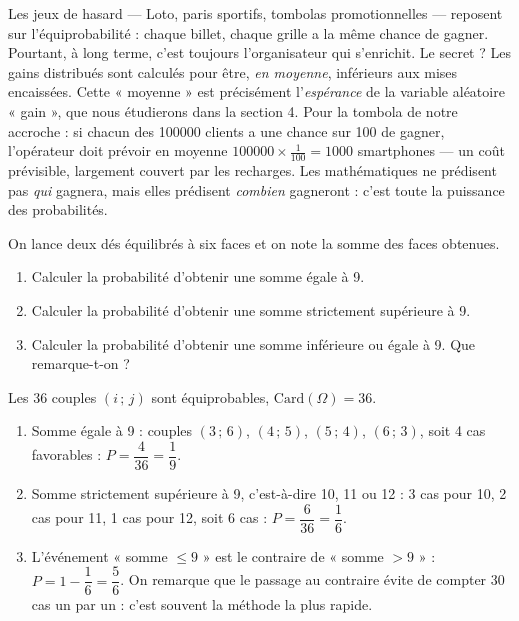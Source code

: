\documentclass[11pt]{article}
\begin{document}
\begin{savaistu}
Les jeux de hasard — Loto, paris sportifs, tombolas promotionnelles — reposent sur l'équiprobabilité : chaque billet, chaque grille a la même chance de gagner. Pourtant, à long terme, c'est toujours l'organisateur qui s'enrichit. Le secret ? Les gains distribués sont calculés pour être, \emph{en moyenne}, inférieurs aux mises encaissées. Cette « moyenne » est précisément l'\emph{espérance} de la variable aléatoire « gain », que nous étudierons dans la section 4. Pour la tombola de notre accroche : si chacun des \num{100000} clients a une chance sur 100 de gagner, l'opérateur doit prévoir en moyenne $\num{100000} \times \frac{1}{100} = \num{1000}$ smartphones — un coût prévisible, largement couvert par les recharges. Les mathématiques ne prédisent pas \emph{qui} gagnera, mais elles prédisent \emph{combien} gagneront : c'est toute la puissance des probabilités.
\end{savaistu}

\begin{exercice}
On lance deux dés équilibrés à six faces et on note la somme des faces obtenues.
\begin{enumerate}
\item Calculer la probabilité d'obtenir une somme égale à 9.
\item Calculer la probabilité d'obtenir une somme strictement supérieure à 9.
\item Calculer la probabilité d'obtenir une somme inférieure ou égale à 9. Que remarque-t-on ?
\end{enumerate}
\end{exercice}

\begin{corrige}
Les 36 couples $(i\,;\,j)$ sont équiprobables, $\mathrm{Card}(\Omega) = 36$.
\begin{enumerate}
\item Somme égale à 9 : couples $(3\,;\,6)$, $(4\,;\,5)$, $(5\,;\,4)$, $(6\,;\,3)$, soit 4 cas favorables : $P = \dfrac{4}{36} = \dfrac{1}{9}$.
\item Somme strictement supérieure à 9, c'est-à-dire 10, 11 ou 12 : 3 cas pour 10, 2 cas pour 11, 1 cas pour 12, soit 6 cas : $P = \dfrac{6}{36} = \dfrac{1}{6}$.
\item L'événement « somme $\le 9$ » est le contraire de « somme $> 9$ » : $P = 1 - \dfrac{1}{6} = \dfrac{5}{6}$. On remarque que le passage au contraire évite de compter 30 cas un par un : c'est souvent la méthode la plus rapide.
\end{enumerate}
\end{corrige}
\end{document}
